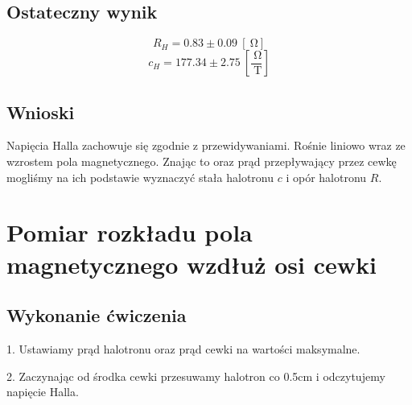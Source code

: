 \documentclass{fizykalab}
\begin{document}
{{\subsection*{Ostateczny wynik}
\par
\[ R_H = 0.83 \pm 0.09 \ [\SI{}{\ohm}] \]
\[ c_H = 177.34 \pm 2.75 \ \left[\frac{\SI{}{\ohm}}{\SI{}{\tesla}}\right] \]

\subsection*{Wnioski}
\par
Napięcia Halla zachowuje się zgodnie z przewidywaniami.
Rośnie liniowo wraz ze wzrostem pola magnetycznego.
Znając to oraz prąd przepływający przez cewkę mogliśmy na ich podstawie wyznaczyć stała halotronu $c$ i opór halotronu $R$.


\newpage


\section*{Pomiar rozkładu pola magnetycznego wzdłuż osi cewki}
{\setlength{\parindent}{0pt}
\subsection*{Wykonanie ćwiczenia}
\par
1. Ustawiamy prąd halotronu oraz prąd cewki na wartości maksymalne.

2. Zaczynając od środka cewki przesuwamy halotron co 0.5cm i odczytujemy napięcie Halla.

}}}
\end{document}
